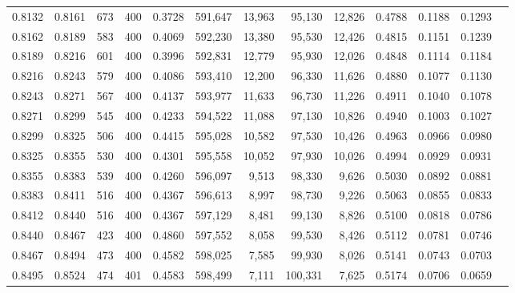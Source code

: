 \begin{tabular}{rrrrrrrrrrrrr}
0.8132 & 0.8161 &    673 & 400 &                                     0.3728 & 591,647 &  13,963 &  95,130 &  12,826 & 0.4788 & 0.1188 & 0.1293 \\
0.8162 & 0.8189 &    583 & 400 &                                     0.4069 & 592,230 &  13,380 &  95,530 &  12,426 & 0.4815 & 0.1151 & 0.1239 \\
0.8189 & 0.8216 &    601 & 400 &                                     0.3996 & 592,831 &  12,779 &  95,930 &  12,026 & 0.4848 & 0.1114 & 0.1184 \\
0.8216 & 0.8243 &    579 & 400 &                                     0.4086 & 593,410 &  12,200 &  96,330 &  11,626 & 0.4880 & 0.1077 & 0.1130 \\
0.8243 & 0.8271 &    567 & 400 &                                     0.4137 & 593,977 &  11,633 &  96,730 &  11,226 & 0.4911 & 0.1040 & 0.1078 \\
0.8271 & 0.8299 &    545 & 400 &                                     0.4233 & 594,522 &  11,088 &  97,130 &  10,826 & 0.4940 & 0.1003 & 0.1027 \\
0.8299 & 0.8325 &    506 & 400 &                                     0.4415 & 595,028 &  10,582 &  97,530 &  10,426 & 0.4963 & 0.0966 & 0.0980 \\
0.8325 & 0.8355 &    530 & 400 &                                     0.4301 & 595,558 &  10,052 &  97,930 &  10,026 & 0.4994 & 0.0929 & 0.0931 \\
0.8355 & 0.8383 &    539 & 400 &                                     0.4260 & 596,097 &   9,513 &  98,330 &   9,626 & 0.5030 & 0.0892 & 0.0881 \\
0.8383 & 0.8411 &    516 & 400 &                                     0.4367 & 596,613 &   8,997 &  98,730 &   9,226 & 0.5063 & 0.0855 & 0.0833 \\
0.8412 & 0.8440 &    516 & 400 &                                     0.4367 & 597,129 &   8,481 &  99,130 &   8,826 & 0.5100 & 0.0818 & 0.0786 \\
0.8440 & 0.8467 &    423 & 400 &                                     0.4860 & 597,552 &   8,058 &  99,530 &   8,426 & 0.5112 & 0.0781 & 0.0746 \\
0.8467 & 0.8494 &    473 & 400 &                                     0.4582 & 598,025 &   7,585 &  99,930 &   8,026 & 0.5141 & 0.0743 & 0.0703 \\
0.8495 & 0.8524 &    474 & 401 &                                     0.4583 & 598,499 &   7,111 & 100,331 &   7,625 & 0.5174 & 0.0706 & 0.0659 \\

\end{tabular}
